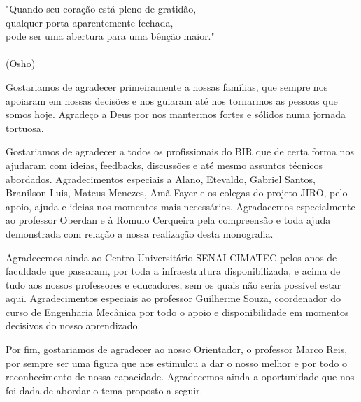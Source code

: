 \begin{agradecimentos}
\begin{flushright}
	"Quando seu coração está pleno de gratidão,\\ qualquer porta aparentemente fechada,\\ 
	pode ser uma abertura para uma bênção maior." \\
	\ \\
	(Osho)
\end{flushright}
Gostariamos de agradecer primeiramente a nossas famílias, que sempre nos apoiaram em nossas decisões e nos guiaram até nos tornarmos as pessoas que somos hoje. Agradeço a Deus por nos mantermos fortes e sólidos numa jornada tortuosa.

Gostariamos de agradecer a todos os profissionais do BIR que de certa forma nos ajudaram com ideias, feedbacks, discussões e até mesmo assuntos técnicos abordados. Agradecimentos especiais a Alano, Etevaldo, Gabriel Santos, Branilson Luis, Mateus Menezes, Amã Fayer e os colegas do projeto JIRO, pelo apoio, ajuda e ideias nos momentos mais necessários. Agradacemos especialmente ao professor Oberdan e à Romulo Cerqueira pela compreensão e toda ajuda demonstrada com relação a nossa realização desta monografia. 

Agradecemos ainda ao Centro Universitário SENAI-CIMATEC pelos anos de faculdade que passaram, por toda a infraestrutura disponibilizada, e acima de tudo aos nossos professores e educadores, sem os quais não seria possível estar aqui. Agradecimentos especiais ao professor Guilherme Souza, coordenador do curso de Engenharia Mecânica por todo o apoio e disponibilidade em momentos decisivos do nosso aprendizado.

Por fim, gostariamos de agradecer ao nosso Orientador, o professor Marco Reis, por sempre ser uma figura que nos estimulou a dar o nosso melhor e por todo o reconhecimento de nossa capacidade. Agradecemos ainda a oportunidade que nos foi dada de abordar o tema proposto a seguir.
\end{agradecimentos}